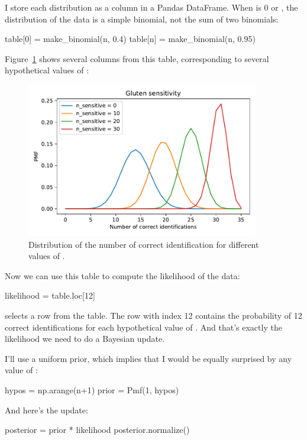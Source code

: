 \documentclass[12pt]{book}
\theoremstyle{exercise}
\begin{document}
I store each distribution as a column in a Pandas DataFrame.
When  is 0 or , the distribution of the data is a simple binomial, not the sum of two binomials:

\begin{code}
table[0] = make_binomial(n, 0.4)
table[n] = make_binomial(n, 0.95)
\end{code}

Figure~\ref{fig05-03} shows several columns from this table, corresponding to several hypothetical values of :

\begin{figure}
\centerline{\includegraphics[width=4in]{figs/fig05-03.pdf}}
\caption{Distribution of the number of correct identification for different values of .}
\label{fig05-03}
\end{figure}

Now we can use this table to compute the likelihood of the data:

\begin{code}
likelihood = table.loc[12]
\end{code}

 selects a row from the table.
The row with index 12 contains the probability of 12 correct identifications for each hypothetical value of .
And that's exactly the likelihood we need to do a Bayesian update.

I'll use a uniform prior, which implies that I would be equally surprised by any value of :

\begin{code}
hypos = np.arange(n+1)
prior = Pmf(1, hypos)
\end{code}

And here's the update:

\begin{code}
posterior = prior * likelihood
posterior.normalize()
\end{code}
\end{document}
